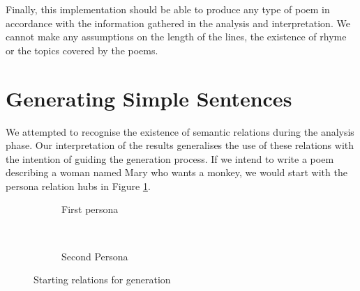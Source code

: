 Finally, this implementation should be able to produce any type of poem in accordance with the information gathered in the analysis and interpretation. We cannot make any assumptions on the length of the lines, the existence of rhyme or the topics covered by the poems.


\section{Generating Simple Sentences}
\label{sec:build}
We attempted to recognise the existence of semantic relations during the analysis phase. Our interpretation of the results generalises the use of these relations with the intention of guiding the generation process. If we intend to write a poem describing a woman named Mary who wants a monkey, we would start with the persona relation hubs in Figure \ref{fig:starting}.
\begin{figure}[h!]
\centering
\begin{subfigure}[t]{0.45\textwidth}
	\centering
    \caption{First persona}
\end{subfigure}
~
\begin{subfigure}[t]{0.45\textwidth}
	\centering
    \caption{Second Persona}
\end{subfigure}
\caption{Starting relations for generation}
\label{fig:starting}
\end{figure}

